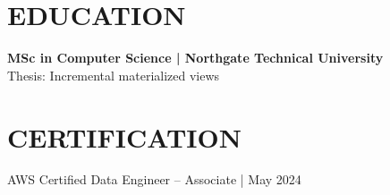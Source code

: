 \documentclass[11pt,a4paper]{article}
\begin{document}
\section*{EDUCATION}
\textbf{MSc in Computer Science | Northgate Technical University}\\
Thesis: Incremental materialized views

\section*{CERTIFICATION}
AWS Certified Data Engineer – Associate | May 2024
\end{document}
